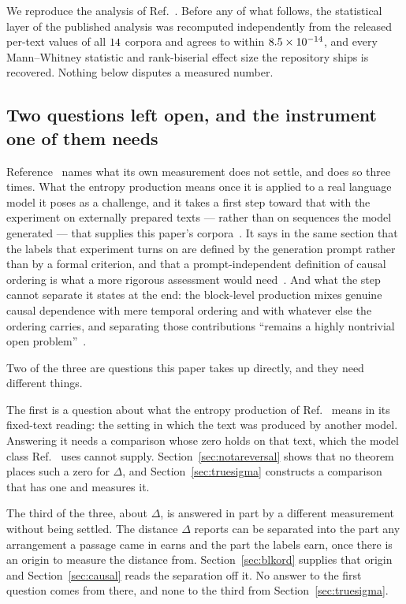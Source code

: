 We reproduce the analysis of Ref.~\cite{sagawa2026}.  Before any of what
follows, the statistical layer of the published analysis was recomputed independently from the released per-text
values of all $14$ corpora and agrees to within $8.5\times10^{-14}$,
and every
Mann--Whitney statistic and rank-biserial effect size the repository ships is
recovered.  Nothing below disputes a measured number.

\subsection*{Two questions left open, and the instrument one of them needs}

Reference~\cite{sagawa2026} names what its own measurement does not settle,
and does so three times.  What the entropy production means once it is
applied to a real language model it poses as a challenge, and it takes a
first step toward that with the experiment on externally prepared texts ---
rather than on sequences the model generated --- that supplies this paper's
corpora~\cite[Sec.~V~B]{sagawa2026}.  It says in the same section that the
labels that experiment turns on are defined by the generation prompt rather
than by a formal criterion, and that a prompt-independent definition of
causal ordering is what a more rigorous assessment would
need~\cite[Sec.~V~B]{sagawa2026}.  And what the step cannot separate it
states at the end: the block-level production mixes genuine causal
dependence with mere temporal ordering and with whatever else the ordering
carries, and separating those contributions ``remains a highly nontrivial
open problem''~\cite[Sec.~VIII]{sagawa2026}.

Two of the three are questions this paper takes up directly, and they need
different things.

The first is a question about what the entropy production of
Ref.~\cite{sagawa2026} means in its fixed-text reading: the setting in
which the text was produced by another model.  Answering it needs a
comparison whose zero holds on that text, which the model class
Ref.~\cite{sagawa2026} uses cannot supply.
Section~\ref{sec:notareversal} shows that no theorem places such a zero for
$\Delta$, and Section~\ref{sec:truesigma} constructs a comparison that has
one and measures it.

The third of the three, about $\Delta$, is answered in part by a different
measurement without being settled.  The distance $\Delta$ reports can be
separated into the part any arrangement a passage came in earns and the
part the labels earn, once there is an origin to measure the distance from.
Section~\ref{sec:blkord} supplies that origin and Section~\ref{sec:causal}
reads the separation off it.  No answer to the first question comes from
there, and none to the third from Section~\ref{sec:truesigma}.

